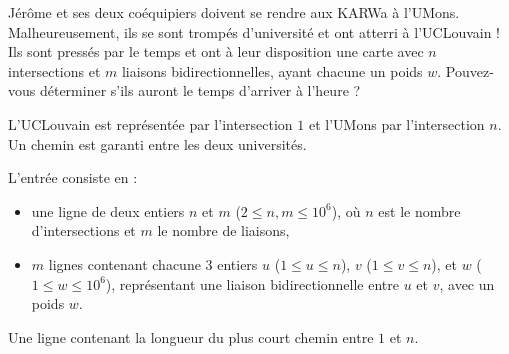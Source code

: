 \problemname{\problemyamlname}



Jérôme et ses deux coéquipiers doivent se rendre aux KARWa à l'UMons.
Malheureusement, ils se sont trompés d'université et ont atterri à l'UCLouvain !
Ils sont pressés par le temps et ont à leur disposition une carte avec $n$ intersections et $m$ liaisons bidirectionnelles, ayant chacune un poids $w$.
Pouvez-vous déterminer s'ils auront le temps d'arriver à l'heure ?

L'UCLouvain est représentée par l'intersection $1$ et l'UMons par l'intersection $n$.
Un chemin est garanti entre les deux universités.

\begin{Input}
	L'entrée consiste en :
	\begin{itemize}
		\item une ligne de deux entiers $n$ et $m$ ($2 \le n, m \le 10^6$), où $n$ est le nombre d'intersections et $m$ le nombre de liaisons,
		\item $m$ lignes contenant chacune 3 entiers $u$ ($1 \le u \le n$), $v$ ($1 \le v \le n$), et $w$ ($1 \le w \le 10^6$), représentant une liaison bidirectionnelle entre $u$ et $v$, avec un poids $w$.
	\end{itemize}
\end{Input}

\begin{Output}
	Une ligne contenant la longueur du plus court chemin entre $1$ et $n$.
\end{Output}
